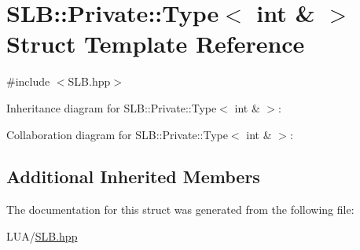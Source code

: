 \hypertarget{structSLB_1_1Private_1_1Type_3_01int_01_6_01_4}{}\section{S\+LB\+:\+:Private\+:\+:Type$<$ int \& $>$ Struct Template Reference}
\label{structSLB_1_1Private_1_1Type_3_01int_01_6_01_4}


{\ttfamily \#include $<$S\+L\+B.\+hpp$>$}



Inheritance diagram for S\+LB\+:\+:Private\+:\+:Type$<$ int \& $>$\+:


Collaboration diagram for S\+LB\+:\+:Private\+:\+:Type$<$ int \& $>$\+:
\subsection*{Additional Inherited Members}


The documentation for this struct was generated from the following file\+:\begin{DoxyCompactItemize}
\item 
L\+U\+A/\hyperlink{SLB_8hpp}{S\+L\+B.\+hpp}\end{DoxyCompactItemize}
